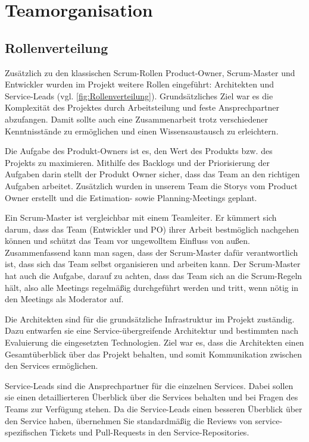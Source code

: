 
\chapter{Teamorganisation} \label{team_orga}

\section{Rollenverteilung}
    Zusätzlich zu den klassischen Scrum-Rollen Product-Owner, Scrum-Master und Entwickler 
    wurden im Projekt weitere Rollen eingeführt: Architekten und Service-Leads (vgl. \ref*{fig:Rollenverteilung}). 
    Grundsätzliches Ziel war es die Komplexität des Projektes durch Arbeitsteilung und feste Ansprechpartner abzufangen.
    Damit sollte auch eine Zusammenarbeit trotz verschiedener Kenntnisstände zu ermöglichen und einen Wissensaustausch zu erleichtern.   

    Die Aufgabe des Produkt-Owners ist es, den Wert des Produkts bzw. des Projekts
    zu maximieren. Mithilfe des Backlogs und der Priorisierung der Aufgaben darin stellt der Produkt Owner
    sicher, dass das Team an den richtigen Aufgaben arbeitet.
    Zusätzlich wurden in unserem Team die Storys vom Product Owner erstellt und die Estimation- sowie Planning-Meetings geplant.

    Ein Scrum-Master ist vergleichbar mit einem Teamleiter. Er kümmert sich darum, dass
    das Team (Entwickler und PO) ihrer Arbeit bestmöglich nachgehen können und schützt
    das Team vor ungewolltem Einfluss von außen. Zusammenfassend kann
    man sagen, dass der Scrum-Master dafür verantwortlich ist, dass sich das Team selbst
    organisieren und arbeiten kann. Der Scrum-Master hat auch die Aufgabe, darauf zu achten, dass das Team sich an die
    Scrum-Regeln hält, also alle Meetings regelmäßig durchgeführt werden und tritt, wenn nötig in den Meetings als Moderator auf.

    Die Architekten sind für die grundsätzliche Infrastruktur im Projekt zuständig. 
    Dazu entwarfen sie eine Service-übergreifende Architektur und bestimmten nach Evaluierung die eingesetzten Technologien.
    Ziel war es, dass die Architekten einen Gesamtüberblick über das Projekt behalten, 
    und somit Kommunikation zwischen den Services ermöglichen.
     
    
    Service-Leads sind die Ansprechpartner für die einzelnen Services. Dabei sollen sie einen detaillierteren Überblick über die Services behalten 
    und bei Fragen des Teams zur Verfügung stehen. 
    Da die Service-Leads einen besseren Überblick über den Service haben, 
    übernehmen Sie standardmäßig die Reviews von service-spezifischen Tickets und Pull-Requests in den Service-Repositories.

